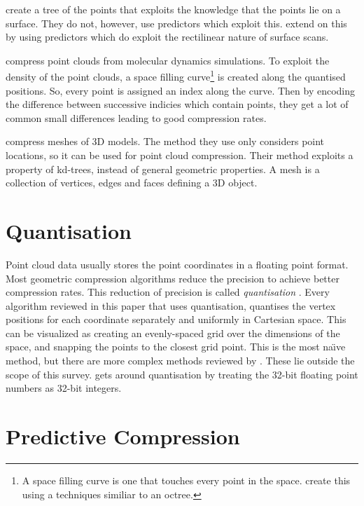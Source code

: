 \documentclass{report}
\begin{document}
\citet{gumholdcomp} create a tree of the points that exploits the knowledge
that the points lie on a surface. They do not, however, use predictors which
exploit this. \citet{merrycomp} extend on this by using predictors which do
exploit the rectilinear nature of surface scans.

\citet{omeltchenko2000sls} compress point clouds from molecular dynamics
simulations. To exploit the density of the point clouds, a space filling
curve\footnote{A space filling curve is one that touches every point in the
  space. \citet{omeltchenko2000sls} create this using a techniques similiar to
  an octree.} is created along the quantised positions. So, every point is
assigned an index along the curve. Then by encoding the difference between
successive indicies which contain points, they get a lot of common small
differences leading to good compression rates.

\citet{devillers2000gci} compress meshes of 3D models. The method they use
only considers point locations, so it can be used for point cloud
compression. Their method exploits a property of kd-trees, instead of general
geometric properties. A mesh is a collection of vertices, edges and faces
defining a 3D object.


\section{Quantisation}

Point cloud data usually stores the point coordinates in a floating point
format. Most geometric compression algorithms reduce the precision to achieve
better compression rates. This reduction of precision is called
\emph{quantisation} \citep{ag-racm-03}. Every algorithm reviewed in this paper
that uses quantisation, quantises the vertex positions for each coordinate
separately and uniformly in Cartesian space. This can be visualized as
creating an evenly-spaced grid over the dimensions of the space, and snapping
the points to the closest grid point. This is the most na\"{\i}ve method, but
there are more complex methods reviewed by \citet{ag-racm-03}. These lie
outside the scope of this survey. \citet{chen2005lcp} gets around quantisation
by treating the 32-bit floating point numbers as 32-bit integers.


\section{Predictive Compression}
\end{document}
